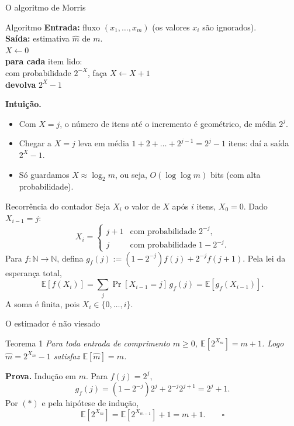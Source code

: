 \documentclass[aspectratio=169,10pt]{beamer}
\newcommand{\conj}[1]{\{#1\}}
\newcommand{\E}[1]{\mathbb{E}\!\left[#1\right]}
\newcommand{\coloneqq}{\mathrel{:=}}
\begin{document}
\begin{frame}{O algoritmo de Morris}
  \begin{block}{Algoritmo}
    \textbf{Entrada:} fluxo $(x_1,\dots,x_m)$ (os valores $x_i$ são
    ignorados). \\ \textbf{Saída:} estimativa $\widehat m$ de $m$.\\[2pt]
    $X\gets0$\\
    \textbf{para cada} item lido: \\
     com probabilidade $2^{-X}$, faça
    $X\gets X+1$\\
    \textbf{devolva} $2^X-1$
  \end{block}\pause
  \textbf{Intuição.}
  \begin{itemize}
  \item Com $X=j$, o número de itens até o incremento é geométrico, de
    média $2^j$.
  \item Chegar a $X=j$ leva em média $1+2+\dots+2^{j-1}=2^j-1$ itens:
    daí a saída $2^X-1$.
  \item Só guardamos $X\approx\log_2m$, ou seja, $O(\log\log m)$ bits
    (com alta probabilidade).
  \end{itemize}
\end{frame}

\begin{frame}{Recorrência do contador}
  Seja $X_i$ o valor de $X$ após $i$ itens, $X_0=0$. Dado $X_{i-1}=j$:
  \[
    X_i=
    \begin{cases}
      j+1 & \text{com probabilidade } 2^{-j},\\
      j & \text{com probabilidade } 1-2^{-j}.
    \end{cases}
  \]
  Para $f\colon\mathbb N\to\mathbb N$, defina
  $g_f(j)\coloneqq(1-2^{-j})f(j)+2^{-j}f(j+1)$. Pela lei da esperança
  total,
  \[
    \E{f(X_i)}=\sum_j\Pr[X_{i-1}=j]\,g_f(j)=\E{g_f(X_{i-1})}.
    \tag{$\ast$}
  \]
  A soma é finita, pois $X_i\in\conj{0,\dots,i}$.
\end{frame}

\begin{frame}{O estimador é não viesado}
  \begin{block}{Teorema 1}
    \textit{ Para toda entrada de comprimento $m\geq0$,
      $\E{2^{X_m}}=m+1$. Logo $\widehat m=2^{X_m}-1$ satisfaz
      $\E{\widehat m}=m$.}
  \end{block}

  \pause
  
  \textbf{Prova.} Indução em $m$. Para $f(j)=2^j$,
  \[
    g_f(j)=(1-2^{-j})2^j+2^{-j}2^{j+1}=2^j+1.
  \]
  \pause
    Por $(\ast)$ e pela hipótese de indução,
  \[
    \E{2^{X_m}}=\E{2^{X_{m-1}}}+1=m+1.\qquad\square
  \]
\end{frame}
\end{document}
